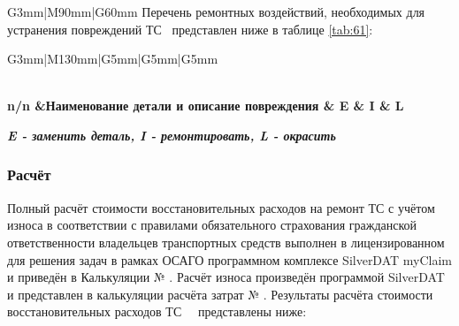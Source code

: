 \begin{longtable}{G{3mm}|M{90mm}|G{60mm}}
Перечень ремонтных воздействий, необходимых для устранения повреждений ТС \, представлен ниже в таблице \ref{tab:61}:\\
%
%
%   
%  

\setcounter{rownum}{0}

\begin{longtable}{G{3mm}|M{130mm}|G{5mm}|G{5mm}|G{5mm}}
	\caption[]{Ремонтные воздействия, необходимые для устранения повреждений ТС }
	\label{tab:61}\\
	\hline  \hline   \toprule 
	\bf  {\footnotesize  n/n}  &\bf {\small Наименование  детали и описание повреждения} & \bf {\small E} & \bf {\small I} & \bf {\small L}\\\hline \hline \toprule  \endhead 
	
	 
	
	\textbf{\textit{E - заменить деталь, I - ремонтировать, L - окрасить} }
	
		
	\renewcommand\baselinestretch{1.2}\small\normalsize 
%
\subsubsection{ Расчёт}
    
\indent Полный расчёт стоимости восстановительных расходов на ремонт ТС с учётом износа в соответствии с правилами обязательного страхования гражданской ответственности владельцев транспортных средств выполнен в  лицензированном для решения задач в рамках ОСАГО программном комплексе   SilverDAT myClaim и приведён в Калькуляции № \NomerDoc.
 Расчёт износа произведён программой  SilverDAT и представлен  в калькуляции расчёта затрат № \NomerDoc.
\indent Результаты расчёта  стоимости восстановительных расходов ТС \, \, представлены ниже:\\
  

\end{longtable}
\end{longtable}
